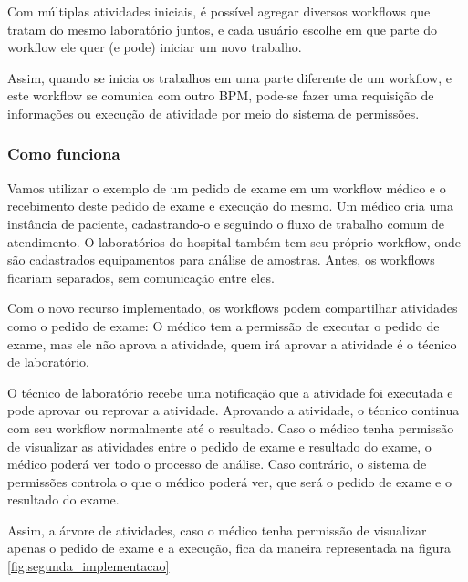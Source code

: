 Com múltiplas atividades iniciais, é possível agregar diversos workflows que tratam do mesmo laboratório juntos, e cada usuário escolhe em que parte do workflow ele quer (e pode) iniciar um novo trabalho.

Assim, quando se inicia os trabalhos em uma parte diferente de um workflow, e este workflow se comunica com outro BPM, pode-se fazer uma requisição de informações ou execução de atividade por meio do sistema de permissões.

\subsubsection{Como funciona}

Vamos utilizar o exemplo de um pedido de exame em um workflow médico e o recebimento deste pedido de exame e execução do mesmo.
Um médico cria uma instância de paciente, cadastrando-o e seguindo o fluxo de trabalho comum de atendimento.
O laboratórios do hospital também tem seu próprio workflow, onde são cadastrados equipamentos para análise de amostras.
Antes, os workflows ficariam separados, sem comunicação entre eles.

Com o novo recurso implementado, os workflows podem compartilhar atividades como o pedido de exame: O médico tem a permissão de executar o pedido de exame, mas ele não aprova a atividade, quem irá aprovar a atividade é o técnico de laboratório.

O técnico de laboratório recebe uma notificação que a atividade foi executada e pode aprovar ou reprovar a atividade.
Aprovando a atividade, o técnico continua com seu workflow normalmente até o resultado.
Caso o médico tenha permissão de visualizar as atividades entre o pedido de exame e resultado do exame, o médico poderá ver todo o processo de análise.
Caso contrário, o sistema de permissões controla o que o médico poderá ver, que será o pedido de exame e o resultado do exame.

Assim, a árvore de atividades, caso o médico tenha permissão de visualizar apenas o pedido de exame e a execução, fica da maneira representada na figura \ref{fig:segunda_implementacao}

